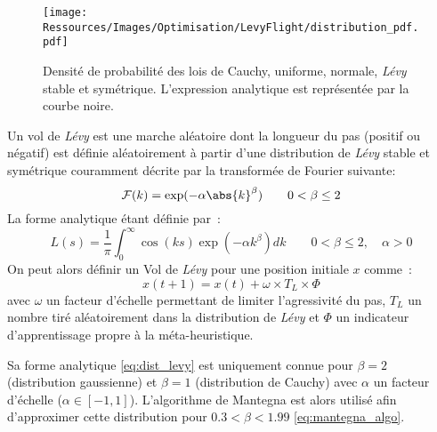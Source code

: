 \begin{figure}
    \centering
    \texttt{[image: Ressources/Images/Optimisation/LevyFlight/distribution\_pdf.pdf]}
    \caption[Densité de probabilité de différentes loi de distribution]
            {Densité de probabilité des lois de Cauchy, uniforme, normale, \textit{Lévy} stable et symétrique.
             L’expression analytique est représentée par la courbe noire.}
    \label{fig:distribution_pdf}
\end{figure}

\begin{Def}\label{def:vol_levy}
Un vol de \textit{Lévy} est une marche aléatoire dont la longueur du pas (positif ou négatif)
est définie aléatoirement à partir d’une distribution de \textit{Lévy} stable et symétrique
couramment décrite par la transformée de Fourier suivante:
\begin{equation}\label{eq:fourier_levy}
    \mathcal{F}(k) = \exp(-\alpha\abs{k}^{\beta}) \qquad  0 < \beta \leq 2
\end{equation}
La forme analytique étant définie par~:
\begin{equation}\label{eq:dist_levy}
    L(s) = \frac{1}{\pi} \int_{0}^{\infty} \cos(k s)\exp(-\alpha k^{\beta}) dk \qquad  0 < \beta \leq 2,
           \quad \alpha > 0
\end{equation}
On peut alors définir un Vol de \textit{Lévy} pour une position initiale $x$ comme~:
\begin{equation}
  x(t + 1) = x(t) + \omega \times T_{L} \times \Phi
\end{equation}
avec $\omega$ un facteur d’échelle permettant de limiter l’agressivité du pas,
$T_{L}$ un nombre tiré aléatoirement dans la distribution de \textit{Lévy} et $\Phi$
un indicateur d’apprentissage propre à la méta-heuristique.
\end{Def}

Sa forme analytique \eqref{eq:dist_levy} est uniquement connue pour $\beta = 2$
(distribution gaussienne) et $\beta = 1$ (distribution de Cauchy) avec $\alpha$
un facteur d’échelle ($\alpha \in [-1, 1]$).
L’algorithme de Mantegna \parencite{Mantegna19944677} est alors utilisé afin
d’approximer cette distribution pour $\num{0.3} < \beta < \num{1.99}$ \eqref{eq:mantegna_algo}.

